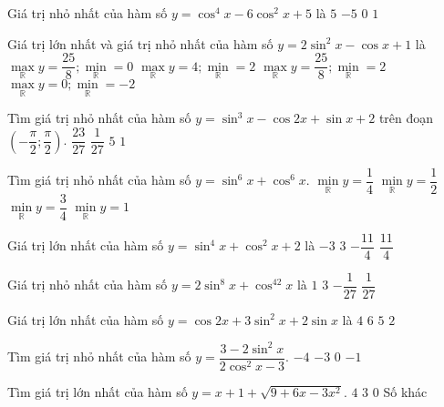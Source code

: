 \begin{ex}%
	Giá trị nhỏ nhất của hàm số $y=\cos^4x-6\cos^2x+5$ là 
	\choice
	{$5$}
	{$-5$}
	{\True $0$}
	{$1$}
\end{ex}
\begin{ex}%
	Giá trị lớn nhất và giá trị nhỏ nhất của hàm số $y=2\sin^2x-\cos x+1$ là 
	\choice
	{\True $\max\limits_{\mathbb{R}} y=\dfrac{25}{8};\min\limits_{\mathbb{R}}=0$}
	{$\max\limits_{\mathbb{R}} y=4;\min\limits_{\mathbb{R}}=2$}
	{$\max\limits_{\mathbb{R}} y=\dfrac{25}{8};\min\limits_{\mathbb{R}}=2$}
	{$\max\limits_{\mathbb{R}} y=0;\min\limits_{\mathbb{R}}=-2$}
\end{ex}
\begin{ex}%
	Tìm giá trị nhỏ nhất của hàm số $y=\sin^3x-\cos2x+\sin x+2$ trên đoạn $\left(-\dfrac{\pi}{2};\dfrac{\pi}{2}\right)$. 
	\choice
	{\True $\dfrac{23}{27}$}
	{$\dfrac{1}{27}$}
	{$5$}
	{$1$}
\end{ex}
\begin{ex}%
	Tìm giá trị nhỏ nhất của hàm số $y=\sin^6x+\cos^6x$. 
	\choice
	{\True $\min\limits_{\mathbb{R}} y=\dfrac{1}{4}$}
	{$\min\limits_{\mathbb{R}} y=\dfrac{1}{2}$}
	{$\min\limits_{\mathbb{R}} y=\dfrac{3}{4}$}
	{$\min\limits_{\mathbb{R}} y=1$}
\end{ex}
\begin{ex}%
	Giá trị lớn nhất của hàm số $y=\sin^4x+\cos^2x+2$ là 
	\choice
	{$-3$}
	{\True $3$}
	{$-\dfrac{11}{4}$}
	{$\dfrac{11}{4}$}
\end{ex}
\begin{ex}%
	Giá trị nhỏ nhất của hàm số $y=2\sin^8x+\cos^42x$ là 
	\choice
	{$1$}
	{$3$}
	{$-\dfrac{1}{27}$}
	{\True $\dfrac{1}{27}$}
\end{ex}
\begin{ex}%
	Giá trị lớn nhất của hàm số $y=\cos2x+3\sin^2x+2\sin x$ là 
	\choice
	{\True $4$}
	{$6$}
	{$5$}
	{$2$}
\end{ex}
\begin{ex}%
	Tìm giá trị nhỏ nhất của hàm số $y=\dfrac{3-2\sin^2x}{2\cos^2x-3}$. 
	\choice
	{$-4$}
	{\True $-3$}
	{$0$}
	{$-1$}
\end{ex}
\begin{ex}%
	Tìm giá trị lớn nhất của hàm số $y=x+1+\sqrt{9+6x-3x^2}$. 
	\choice
	{\True $4$}
	{$3$}
	{$0$}
	{Số khác}
\end{ex}

